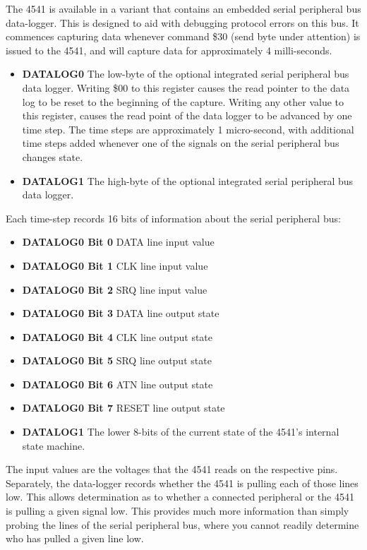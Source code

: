 The 4541 is available in a variant that contains an embedded serial
peripheral bus data-logger. This is designed to aid with debugging
protocol errors on this bus. It commences capturing data whenever
command \$30 (send byte under attention) is issued to the 4541, and
will capture data for approximately 4 milli-seconds.

\begin{itemize}
  \item {\bf DATALOG0} The low-byte of the optional integrated serial
    peripheral bus data logger.  Writing \$00 to this register causes
    the read pointer to the data log to be reset to the beginning of
    the capture. Writing any other value to this register, causes the
    read point of the data logger to be advanced by one time step.
    The time steps are approximately 1 micro-second, with additional
    time steps added whenever one of the signals on the serial
    peripheral bus changes state.
    \item {\bf DATALOG1} The high-byte of the optional integrated serial
      peripheral bus data logger.
\end{itemize}

Each time-step records 16 bits of information about the serial
peripheral bus:
\begin{itemize}
\item {\bf DATALOG0 Bit 0} DATA line input value
\item {\bf DATALOG0 Bit 1} CLK line input value
\item {\bf DATALOG0 Bit 2} SRQ line input value
\item {\bf DATALOG0 Bit 3} DATA line output state
\item {\bf DATALOG0 Bit 4} CLK line output state
\item {\bf DATALOG0 Bit 5} SRQ line output state
\item {\bf DATALOG0 Bit 6} ATN line output state
\item {\bf DATALOG0 Bit 7} RESET line output state
\item {\bf DATALOG1} The lower 8-bits of the current state of the 4541's internal state machine.
\end{itemize}

The input values are the voltages that the 4541 reads on the
respective pins.  Separately, the data-logger records whether the 4541
is pulling each of those lines low.  This allows determination as to
whether a connected peripheral or the 4541 is pulling a given signal
low. This provides much more information than simply probing the lines
of the serial peripheral bus, where you cannot readily determine who
has pulled a given line low.

